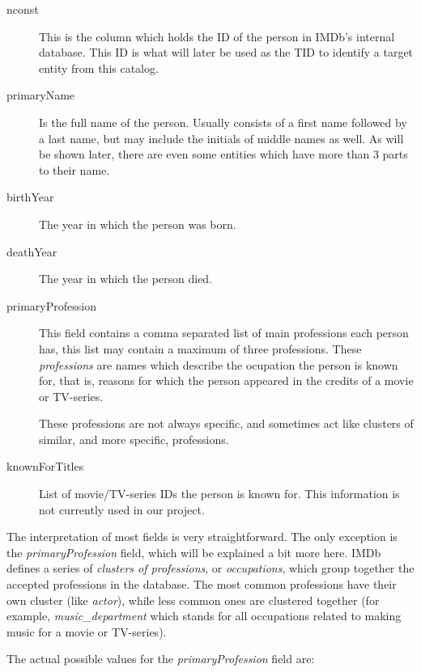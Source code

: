 \documentclass[epsfig,a4paper,11pt,titlepage,twoside,openany]{book}
\begin{document}
\begin{description}
\item[nconst] This is the column which holds the ID of the person in IMDb's internal database. This ID is what will later be used as the TID to identify a target entity from this catalog.

\item[primaryName] Is the full name of the person. Usually consists of a first name followed by a last name, but may include the initials of middle names as well. As will be shown later, there are even some entities which have more than 3 parts to their name.

\item[birthYear] The year in which the person was born.

\item[deathYear] The year in which the person died.

\item[primaryProfession] This field contains a comma separated list of main professions each person has, this list may contain a maximum of three professions. These \textit{professions} are names which describe the ocupation the person is known for, that is, reasons for which the person appeared in the credits of a movie or TV-series. 

These professions are not always specific, and sometimes act like clusters of similar, and more specific, professions.

\item[knownForTitles] List of movie/TV-series IDs the person is known for. This information is not currently used in our project. 
\end{description}

The interpretation of most fields is very straightforward. The only exception is the \textit{primaryProfession} field, which will be explained a bit more here. IMDb defines a series of \textit{clusters of professions}, or \textit{occupations}, which group together the accepted professions in the database. The most common professions have their own cluster (like \textit{actor}), while less common ones are clustered together (for example, \textit{music\_department} which stands for all occupations related to making music for a movie or TV-series).

The actual possible values for the \textit{primaryProfession} field are: 
\end{document}
